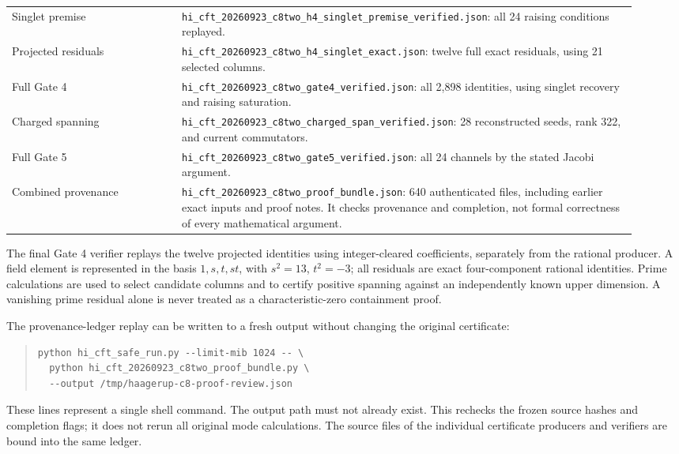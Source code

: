 \documentclass[11pt,a4paper]{article}
\theoremstyle{definition}
\newcommand{\artifact}[1]{\textnormal{\nolinkurl{#1}}}
\begin{document}
\begin{longtable}{@{}p{0.25\linewidth}p{0.67\linewidth}@{}}
Singlet premise &
\artifact{hi_cft_20260923_c8two_h4_singlet_premise_verified.json}:
all 24 raising conditions replayed.\\
Projected residuals &
\artifact{hi_cft_20260923_c8two_h4_singlet_exact.json}:
twelve full exact residuals, using 21 selected columns.\\
Full Gate 4 &
\artifact{hi_cft_20260923_c8two_gate4_verified.json}:
all 2,898 identities, using singlet recovery and raising saturation.\\
Charged spanning &
\artifact{hi_cft_20260923_c8two_charged_span_verified.json}:
28 reconstructed seeds, rank 322, and current commutators.\\
Full Gate 5 &
\artifact{hi_cft_20260923_c8two_gate5_verified.json}:
all 24 channels by the stated Jacobi argument.\\
Combined provenance &
\artifact{hi_cft_20260923_c8two_proof_bundle.json}:
640 authenticated files, including earlier exact inputs and proof notes.
It checks provenance and completion, not formal correctness of every
mathematical argument.\\
\end{longtable}

The final Gate 4 verifier replays the twelve projected identities using
integer-cleared coefficients, separately from the rational producer.
A field element is represented in the basis
\(1,s,t,st\), with \(s^2=13\), \(t^2=-3\); all residuals are
exact four-component rational identities. Prime calculations are used
to select candidate columns and to certify positive spanning against
an independently known upper dimension. A vanishing prime residual
alone is never treated as a characteristic-zero containment proof.

The provenance-ledger replay can be written to a fresh output without
changing the original certificate:
\begin{quote}\small
\begin{verbatim}
python hi_cft_safe_run.py --limit-mib 1024 -- \
  python hi_cft_20260923_c8two_proof_bundle.py \
  --output /tmp/haagerup-c8-proof-review.json
\end{verbatim}
\end{quote}
These lines represent a single shell command. The output path must not
already exist. This rechecks the frozen source hashes and completion
flags; it does not rerun all original mode calculations. The source
files of the individual certificate producers and verifiers are bound
into the same ledger.
\end{document}
